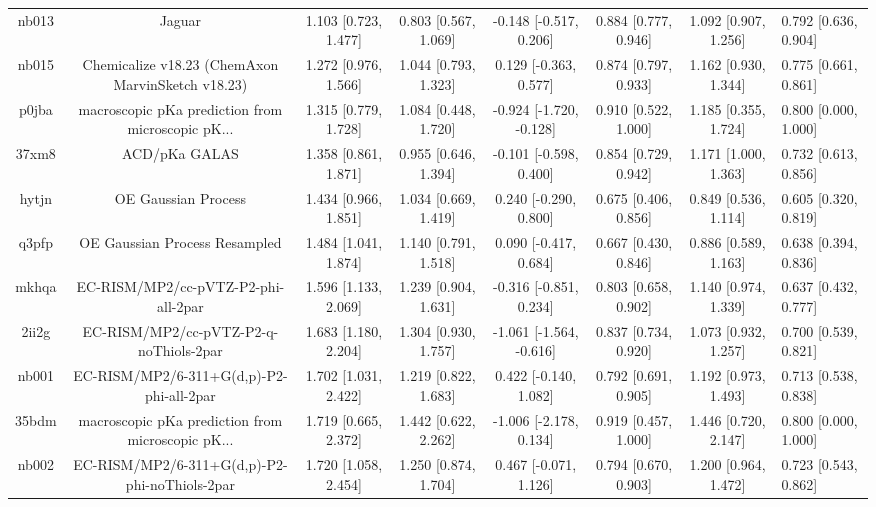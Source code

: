 \documentclass{article}
\begin{document}
\begin{center}
\begin{longtable}{|ccccccc|}
 nb013 &                                             Jaguar &  1.103 [0.723, 1.477] &  0.803 [0.567, 1.069] &   -0.148 [-0.517, 0.206] &  0.884 [0.777, 0.946] &   1.092 [0.907, 1.256] &   0.792 [0.636, 0.904] \\
 nb015 &  Chemicalize v18.23 (ChemAxon MarvinSketch v18.23) &  1.272 [0.976, 1.566] &  1.044 [0.793, 1.323] &    0.129 [-0.363, 0.577] &  0.874 [0.797, 0.933] &   1.162 [0.930, 1.344] &   0.775 [0.661, 0.861] \\
 p0jba &  macroscopic pKa prediction from microscopic pK... &  1.315 [0.779, 1.728] &  1.084 [0.448, 1.720] &  -0.924 [-1.720, -0.128] &  0.910 [0.522, 1.000] &   1.185 [0.355, 1.724] &   0.800 [0.000, 1.000] \\
 37xm8 &                                      ACD/pKa GALAS &  1.358 [0.861, 1.871] &  0.955 [0.646, 1.394] &   -0.101 [-0.598, 0.400] &  0.854 [0.729, 0.942] &   1.171 [1.000, 1.363] &   0.732 [0.613, 0.856] \\
 hytjn &                                OE Gaussian Process &  1.434 [0.966, 1.851] &  1.034 [0.669, 1.419] &    0.240 [-0.290, 0.800] &  0.675 [0.406, 0.856] &   0.849 [0.536, 1.114] &   0.605 [0.320, 0.819] \\
 q3pfp &                      OE Gaussian Process Resampled &  1.484 [1.041, 1.874] &  1.140 [0.791, 1.518] &    0.090 [-0.417, 0.684] &  0.667 [0.430, 0.846] &   0.886 [0.589, 1.163] &   0.638 [0.394, 0.836] \\
 mkhqa &                EC-RISM/MP2/cc-pVTZ-P2-phi-all-2par &  1.596 [1.133, 2.069] &  1.239 [0.904, 1.631] &   -0.316 [-0.851, 0.234] &  0.803 [0.658, 0.902] &   1.140 [0.974, 1.339] &   0.637 [0.432, 0.777] \\
 2ii2g &             EC-RISM/MP2/cc-pVTZ-P2-q-noThiols-2par &  1.683 [1.180, 2.204] &  1.304 [0.930, 1.757] &  -1.061 [-1.564, -0.616] &  0.837 [0.734, 0.920] &   1.073 [0.932, 1.257] &   0.700 [0.539, 0.821] \\
 nb001 &           EC-RISM/MP2/6-311+G(d,p)-P2-phi-all-2par &  1.702 [1.031, 2.422] &  1.219 [0.822, 1.683] &    0.422 [-0.140, 1.082] &  0.792 [0.691, 0.905] &   1.192 [0.973, 1.493] &   0.713 [0.538, 0.838] \\
 35bdm &  macroscopic pKa prediction from microscopic pK... &  1.719 [0.665, 2.372] &  1.442 [0.622, 2.262] &   -1.006 [-2.178, 0.134] &  0.919 [0.457, 1.000] &   1.446 [0.720, 2.147] &   0.800 [0.000, 1.000] \\
 nb002 &      EC-RISM/MP2/6-311+G(d,p)-P2-phi-noThiols-2par &  1.720 [1.058, 2.454] &  1.250 [0.874, 1.704] &    0.467 [-0.071, 1.126] &  0.794 [0.670, 0.903] &   1.200 [0.964, 1.472] &   0.723 [0.543, 0.862] \\

\end{longtable}
\end{center}
\end{document}
